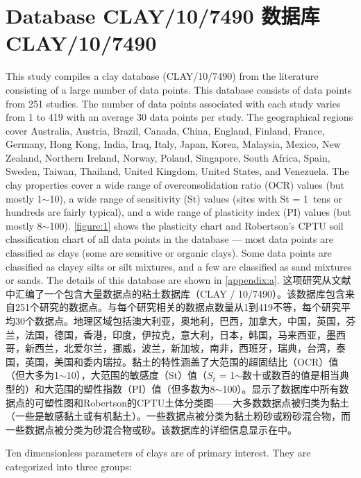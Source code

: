 \section{Database CLAY/10/7490 数据库CLAY/10/7490}

\begin{Parallel}{0.60\textwidth}{}
    \ParallelLText
    {
        This study compiles a clay database (CLAY/10/7490) from the literature consisting of a large number of data points. This database consists of data points from 251 studies. The number of data points associated with each study varies from 1 to 419 with an average 30 data points per study. The geographical regions cover Australia, Austria, Brazil, Canada, China, England, Finland, France, Germany, Hong Kong, India, Iraq, Italy, Japan, Korea, Malaysia, Mexico, New Zealand, Northern Ireland, Norway, Poland, Singapore, South Africa, Spain, Sweden, Taiwan, Thailand, United Kingdom, United States, and Venezuela. The clay properties cover a wide range of overconsolidation ratio (OCR) values (but mostly 1$\sim$10), a wide range of sensitivity (St) values (sites with St = 1~tens or hundreds are fairly typical), and a wide range of plasticity index (PI) values (but mostly 8$\sim$100). \autoref{figure:1} shows the plasticity chart and Robertson’s CPTU soil classification chart \citep{Robertson1990151} of all data points in the database — most data points are classified as clays (some are sensitive or organic clays). Some data points are classified as clayey silts or silt mixtures, and a few are classified as sand mixtures or sands. The details of this database are shown in \autoref{appendix:a}.
    }
    \ParallelRText
    {
        这项研究从文献中汇编了一个包含大量数据点的粘土数据库（CLAY / 10/7490）。该数据库包含来自251个研究的数据点。与每个研究相关的数据点数量从1到419不等，每个研究平均30个数据点。地理区域包括澳大利亚，奥地利，巴西，加拿大，中国，英国，芬兰，法国，德国，香港，印度，伊拉克，意大利，日本，韩国，马来西亚，墨西哥，新西兰，北爱尔兰，挪威，波兰，新加坡，南非，西班牙，瑞典，台湾，泰国，英国，美国和委内瑞拉。黏土的特性涵盖了大范围的超固结比（OCR）值（但大多为1$\sim$10），大范围的敏感度（St）值（$S_t$ = 1$\sim$数十或数百的值是相当典型的）和大范围的塑性指数（PI）值（但多数为8$\sim$100）。显示了数据库中所有数据点的可塑性图和Robertson的CPTU土体分类图\citep{Robertson1990151}——大多数数据点被归类为黏土（一些是敏感黏土或有机黏土）。一些数据点被分类为黏土粉砂或粉砂混合物，而一些数据点被分类为砂混合物或砂。该数据库的详细信息显示在中。
    }
    \ParallelPar
    
    \ParallelLText
    {
        Ten dimensionless parameters of clays are of primary interest. They are categorized into three groups:

}
\end{Parallel}
